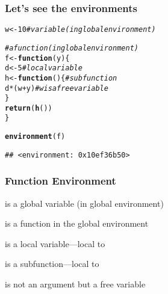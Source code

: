\documentclass[12pt]{beamer}\usepackage[]{graphicx}\usepackage[]{color}
\makeatletter
\newcommand{\hlnum}[1]{\textcolor[rgb]{0.686,0.059,0.569}{#1}}%
\newcommand{\hlcom}[1]{\textcolor[rgb]{0.678,0.584,0.686}{\textit{#1}}}%
\newcommand{\hlopt}[1]{\textcolor[rgb]{0,0,0}{#1}}%
\newcommand{\hlstd}[1]{\textcolor[rgb]{0.345,0.345,0.345}{#1}}%
\newcommand{\hlkwa}[1]{\textcolor[rgb]{0.161,0.373,0.58}{\textbf{#1}}}%
\newcommand{\hlkwb}[1]{\textcolor[rgb]{0.69,0.353,0.396}{#1}}%
\newcommand{\hlkwc}[1]{\textcolor[rgb]{0.333,0.667,0.333}{#1}}%
\newcommand{\hlkwd}[1]{\textcolor[rgb]{0.737,0.353,0.396}{\textbf{#1}}}%
\newenvironment{kframe}{%
 \def\at@end@of@kframe{}%
 \ifinner\ifhmode%
  \def\at@end@of@kframe{\end{minipage}}%
  \begin{minipage}{\columnwidth}%
 \fi\fi%
 \def\FrameCommand##1{\hskip\@totalleftmargin \hskip-\fboxsep
 \colorbox{shadecolor}{##1}\hskip-\fboxsep
     \hskip-\linewidth \hskip-\@totalleftmargin \hskip\columnwidth}%
 \MakeFramed {\advance\hsize-\width
   \@totalleftmargin\z@ \linewidth\hsize
   \@setminipage}}%
 {\par\unskip\endMakeFramed%
 \at@end@of@kframe}
\newenvironment{knitrout}{}{} %
\makeatother
\begin{document}
\begin{frame}[fragile]
\frametitle{Let's see the environments}

\begin{knitrout}\footnotesize
{}\color{fgcolor}\begin{kframe}
\begin{alltt}
\hlstd{w} \hlkwb{<-} \hlnum{10}   \hlcom{# variable (in global environment)}

\hlcom{# a function (in global environment)}
\hlstd{f} \hlkwb{<-} \hlkwa{function}\hlstd{(}\hlkwc{y}\hlstd{) \{}
  \hlstd{d} \hlkwb{<-} \hlnum{5}     \hlcom{# local variable}
  \hlstd{h} \hlkwb{<-} \hlkwa{function}\hlstd{() \{}    \hlcom{# subfunction}
    \hlstd{d} \hlopt{*} \hlstd{(w} \hlopt{+} \hlstd{y)}     \hlcom{# w is a free variable}
  \hlstd{\}}
  \hlkwd{return}\hlstd{(}\hlkwd{h}\hlstd{())}
\hlstd{\}}

\hlkwd{environment}\hlstd{(f)}
\end{alltt}
\begin{verbatim}
## <environment: 0x10ef36b50>
\end{verbatim}
\end{kframe}
\end{knitrout}

\end{frame}


\begin{frame}[fragile]
\frametitle{Function Environment}

\bi
  \item {} is a global variable (in global environment)
  \item {} is a function in the global environment
  \item {} is a local variable---local to 
  \item {} is a subfunction---local to 
  \item {} is not an argument but a free variable
\ei

\end{frame}

\end{document}
